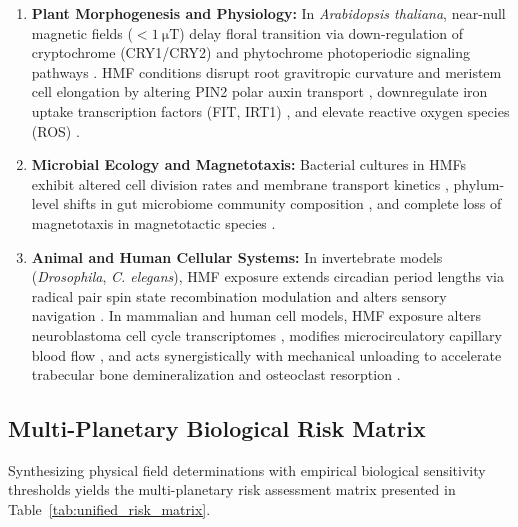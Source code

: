 \begin{enumerate}
    \item \textbf{Plant Morphogenesis and Physiology:} In \textit{Arabidopsis thaliana}, near-null magnetic fields ($<\SI{1}{\micro\tesla}$) delay floral transition via down-regulation of cryptochrome (CRY1/CRY2) and phytochrome photoperiodic signaling pathways \citep{Agliassa2018}. HMF conditions disrupt root gravitropic curvature and meristem cell elongation by altering PIN2 polar auxin transport \citep{Narayana2018}, downregulate iron uptake transcription factors (FIT, IRT1) \citep{Narayana2021}, and elevate reactive oxygen species (ROS) \citep{Maffei2014, Belyavskaya2004}.
    \item \textbf{Microbial Ecology and Magnetotaxis:} Bacterial cultures in HMFs exhibit altered cell division rates and membrane transport kinetics \citep{Creanga2009}, phylum-level shifts in gut microbiome community composition \citep{Zhang2017}, and complete loss of magnetotaxis in magnetotactic species \citep{Frankel1981}.
    \item \textbf{Animal and Human Cellular Systems:} In invertebrate models (\textit{Drosophila}, \textit{C. elegans}), HMF exposure extends circadian period lengths via radical pair spin state recombination modulation \citep{Yoshii2009} and alters sensory navigation \citep{VidalGadea2015}. In mammalian and human cell models, HMF exposure alters neuroblastoma cell cycle transcriptomes \citep{Mo2012}, modifies microcirculatory capillary blood flow \citep{Gurfinkel2014}, and acts synergistically with mechanical unloading to accelerate trabecular bone demineralization and osteoclast resorption \citep{Xu2012, Mo2014}.
\end{enumerate}



\subsection{Multi-Planetary Biological Risk Matrix}
Synthesizing physical field determinations with empirical biological sensitivity thresholds yields the multi-planetary risk assessment matrix presented in Table~\ref{tab:unified_risk_matrix}.


